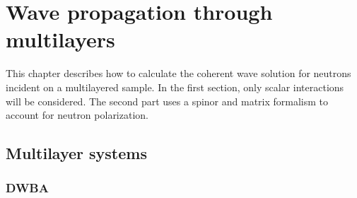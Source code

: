 

\chapter{Wave propagation through multilayers}  \label{sec:Multilayers}

This chapter describes how to calculate the coherent wave solution for neutrons incident on a multilayered sample. In the first section, only scalar interactions will be considered. The second part uses a spinor and matrix formalism to account for neutron polarization.

\section{Multilayer systems}

%

\subsection{DWBA}

